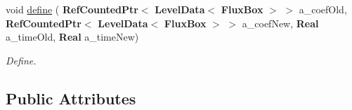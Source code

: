 \begin{DoxyCompactItemize}
\item 
\mbox{\label{class_coefficient_interpolator_linear_face_af27d8bed697ac3ddda5accdd37df3dee}} 
void \hyperlink{class_coefficient_interpolator_linear_face_af27d8bed697ac3ddda5accdd37df3dee}{define} (\textbf{ Ref\+Counted\+Ptr}$<$ \textbf{ Level\+Data}$<$ \textbf{ Flux\+Box} $>$ $>$ a\+\_\+coef\+Old, \textbf{ Ref\+Counted\+Ptr}$<$ \textbf{ Level\+Data}$<$ \textbf{ Flux\+Box} $>$ $>$ a\+\_\+coef\+New, \textbf{ Real} a\+\_\+time\+Old, \textbf{ Real} a\+\_\+time\+New)
\begin{DoxyCompactList}\small\item\em Define. \end{DoxyCompactList}\end{DoxyCompactItemize}
\subsection*{Public Attributes}
